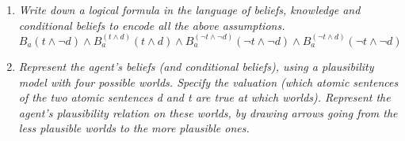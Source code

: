 \documentclass[leqno]{article}
\begin{document}
\begin{enumerate}
    \item \textit{Write down a logical formula in the language of beliefs,
    knowledge and conditional beliefs to encode all the above assumptions.}
    \[
        B_a(t \wedge \neg d) \wedge
        B_a^{(t \wedge d)} (t \wedge d) \wedge
        B_a^{(\neg t \wedge \neg d)} (\neg t \wedge \neg d) \wedge
        B_a^{(\neg t \wedge d)} (\neg t \wedge \neg d)
    \]

    \item \textit{Represent the agent’s beliefs (and conditional beliefs),
    using a plausibility model with four possible worlds. Specify the valuation
    (which atomic sentences of the two atomic sentences d and t are true at
    which worlds). Represent the agent’s plausibility relation on these worlds,
    by drawing arrows going from the less plausible worlds to the more plausible
    ones.}

    \begin{center}
    \end{center}


\end{enumerate}
\end{document}
